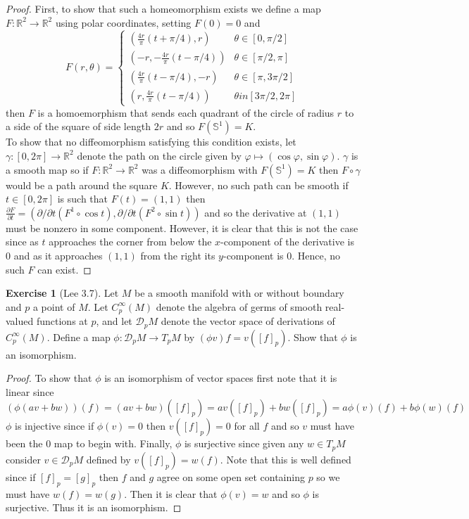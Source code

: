 \documentclass{article}
\newcommand{\bR}{\mathbb{R}}
\newcommand{\vp}{\varphi}
\newcommand{\bS}{\mathbb{S}}
\newcommand{\cD}{\mathcal{D}}
\theoremstyle{definition}
\newtheorem{exercise}{Exercise}
\begin{document}
\begin{proof}
    First, to show that such a homeomorphism exists we define a map $F:\bR^2 \to \bR^2$ using polar coordinates, setting $F(0)=0$ and 
    \[ F(r, \theta) = \begin{cases} (\frac{4r}{\pi}(t + \pi/4), r) &  \theta \in [0, \pi/2] \\ (-r, -\frac{4r}{\pi}(t -\pi/4 ))  &  \theta \in [\pi/2, \pi] \\ (\frac{4r}{\pi}(t - \pi/4) ,-r) & \theta \in [\pi, 3 \pi/2] \\ (r, \frac{4r}{\pi}(t - \pi/4)) & \theta in [3\pi/2, 2\pi] \end{cases} \]
    then $F$ is a homoemorphism that sends each quadrant of the circle of radius $r$ to a side of the square of side length $2r$ and so $F(\bS^1) = K$. \\ 
    To show that no diffeomorphism satisfying this condition exists, let $\gamma: [0, 2\pi] \to \bR^2$ denote the path on the circle given by $\vp \mapsto (\cos \vp, \sin \vp)$. $\gamma$ is a smooth map so if $F: \bR^2 \to \bR^2$ was a diffeomorphism with $F(\bS^1) = K$ then $F \circ \gamma$ would be a path around the square $K$. However, no such path can be smooth if $t \in [0, 2\pi]$ is such that $F(t)= (1,1)$ then $\frac{\partial F}{\partial t} = (\partial/\partial t(F^1 \circ \cos t), \partial /\partial t (F^2 \circ \sin t))$ and so the derivative at $(1,1)$ must be nonzero in some component. However, it is clear that this is not the case since as $t$ approaches the corner from below the $x$-component of the derivative is 0 and as it approaches $(1,1)$ from the right its $y$-component is 0. Hence, no such $F$ can exist. 
\end{proof}

\begin{exercise}[Lee 3.7]
    Let $M$ be a smooth manifold with or without boundary and $p$ a point of $M$. Let $C_p^{\infty}(M)$ denote the algebra of germs of smooth real-valued functions at $p$, and let $\cD_pM$ denote the vector space of derivations of $C_p^{\infty}(M)$. Define a map $\phi: \cD_pM \to T_pM$ by $(\phi v)f = v([f]_p)$. Show that $\phi$ is an isomorphism.
\end{exercise}

\begin{proof}
    To show that $\phi$ is an isomorphism of vector spaces first note that it is linear since 
    \[(\phi(av+bw))(f) = (av+bw)([f]_p) = av([f]_p) + bw([f]_p) = a \phi(v)(f) + b\phi(w)(f) \] 
    $\phi$ is injective since if $\phi(v)=0$ then $v([f]_p)=0$ for all $f$ and so $v$ must have been the 0 map to begin with. Finally, $\phi$ is surjective since given any $w \in T_pM$ consider $v \in \cD_pM$ defined by $v([f]_p)=w(f)$. Note that this is well defined since if $[f]_p = [g]_p$ then $f$ and $g$ agree on some open set containing $p$ so we must have $w(f) = w(g)$. Then it is clear that $\phi(v)=w$ and so $\phi$ is surjective. Thus it is an isomorphism. 
\end{proof}
\end{document}
